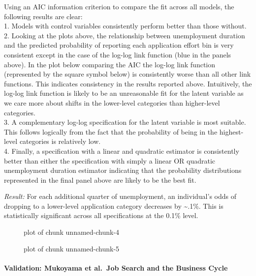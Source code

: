 Using an AIC information criterion to compare the fit across all models,
the following results are clear:\\
1. Models with control variables consistently perform better than those
without.\\
2. Looking at the plots above, the relationship between unemployment
duration and the predicted probability of reporting each application
effort bin is very consistent except in the case of the log-log link
function (blue in the panels above). In the plot below comparing the AIC
the log-log link function (represented by the square symbol below) is
consistently worse than all other link functions. This indicates
consistency in the results reported above. Intuitively, the log-log link
function is likely to be an unreasonable fit for the latent variable as
we care more about shifts in the lower-level categories than
higher-level categories.\\
3. A complementary log-log specification for the latent variable is most
suitable. This follows logically from the fact that the probability of
being in the highest-level categories is relatively low.\\
4. Finally, a specification with a linear and quadratic estimator is
consistently better than either the specification with simply a linear
OR quadratic unemployment duration estimator indicating that the
probability distributions represented in the final panel above are
likely to be the best fit.

\emph{Result:} For each additional quarter of unemployment, an
individual's odds of dropping to a lower-level application category
decreases by \textasciitilde.1\%. This is statistically significant
across all specifications at the 0.1\% level.

\begin{figure}
\centering
{}
\caption{plot of chunk unnamed-chunk-4}
\end{figure}

\begin{figure}
\centering
{}
\caption{plot of chunk unnamed-chunk-5}
\end{figure}

\paragraph{Validation: Mukoyama et al.~Job Search and the Business
Cycle}\label{validation-mukoyama-et-al.-job-search-and-the-business-cycle}

